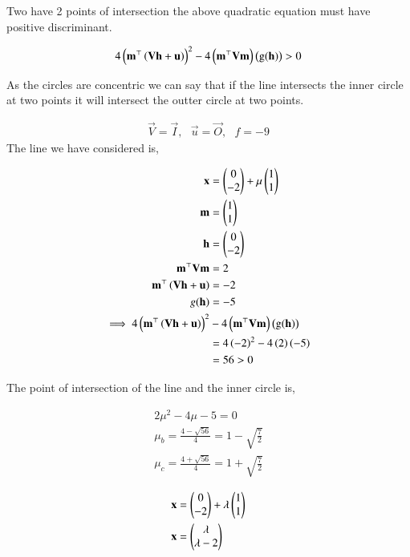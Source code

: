 \documentclass[journal,12pt,twocolumn]{IEEEtran}
\begin{document}
\begin{enumerate}
Two have 2 points of intersection the above quadratic equation must have positive discriminant.

		\begin{align}
			4\left(\mathbf{m}^{\top}\left(\mathbf{V}\mathbf{h}+\mathbf{u}\right)\right)^2-4\left(\mathbf{m}^{\top}\mathbf{V}\mathbf{m}\right)\left(\text{g}(\mathbf{h})\right)>0
		\end{align}

As the circles are concentric we can say that if the line intersects the inner circle at two points it will intersect the outter circle at two points.

		\begin{align}
			\vec{V} = \vec{I}, \text{ } \vec{u} = \vec{O}, \text{ } f = -9 
		\end{align}
The line we have considered is,

		\begin{align}
			\mathbf{x} &= \begin{pmatrix}0\\-2\end{pmatrix}+\mu\begin{pmatrix}1\\1\end{pmatrix}\\
			\mathbf{m} &= \begin{pmatrix}1\\1\end{pmatrix}\\
			\mathbf{h} &= \begin{pmatrix}0\\-2\end{pmatrix}\\
			\mathbf{m}^{\top}\mathbf{V}\mathbf{m} &= 2\\
			\mathbf{m}^{\top}\left(\mathbf{V}\mathbf{h}+\mathbf{u}\right)&=-2\\
			g(\mathbf{h}) &= -5\\
			\implies 4\left(\mathbf{m}^{\top}\left(\mathbf{V}\mathbf{h}+\mathbf{u}\right)\right)^2&-4\left(\mathbf{m}^{\top}\mathbf{V}\mathbf{m}\right)\left(\text{g}(\mathbf{h})\right)\\
			&=4\left(-2\right)^2-4\left(2\right)\left(-5\right)\\
			&=56>0
		\end{align}


The point of intersection of the line and the inner circle is,

		\begin{align}
			2\mu^2-4\mu-5=0\\
			\mu_b = \frac{4-\sqrt{56}}{4} = 1-\sqrt{\frac{7}{2}}\\
			\mu_c = \frac{4+\sqrt{56}}{4} = 1+\sqrt{\frac{7}{2}}
		\end{align}

		\begin{align}
			\mathbf{x} &= \begin{pmatrix}0\\-2\end{pmatrix}+\lambda \begin{pmatrix}1\\1\end{pmatrix}\\
			\mathbf{x} &= \begin{pmatrix}\lambda \\ \lambda - 2\end{pmatrix}
		\end{align}


\end{enumerate}
\end{document}
